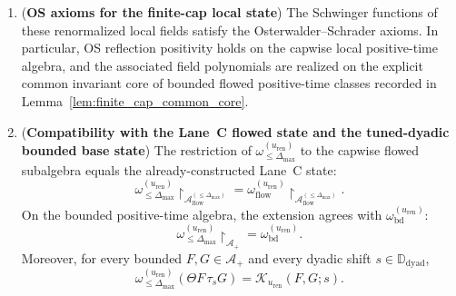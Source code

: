 \begin{theorem}
\begin{enumerate}[label=(\alph*)]
\[
\begin{aligned}
\lim_{t\downarrow 0}\, \omega_{\le \Delta_{\max}}^{(u_{\mathrm{ren}})}\Big(
&\mathcal O^{\mathrm{app},(\le \Delta_{\max})}_{j}(t;f;\mu)
\prod_{\ell=1}^{k} \mathcal X_{\ell}\Big)\\
={}&\omega_{\le \Delta_{\max}}^{(u_{\mathrm{ren}})}\Big(
\big(O^{(j),\mathrm{ren}}_{\le \Delta_{\max}}(f;\mu)
-\omega_{\le \Delta_{\max}}^{(u_{\mathrm{ren}})}(O^{(j),\mathrm{ren}}_{\le \Delta_{\max}}(f;\mu))\big)
\prod_{\ell=1}^{k} \mathcal X_{\ell}\Big).
\end{aligned}
\]
for every finite collection of renormalized local insertions $\{\mathcal X_{\ell}\}$ drawn from the same cap.
\item (\textbf{OS axioms for the finite-cap local state}) The Schwinger functions of these renormalized local fields satisfy the Osterwalder--Schrader axioms.
In particular, OS reflection positivity holds on the capwise local positive-time algebra, and the associated field polynomials are realized on the explicit common invariant core of bounded flowed positive-time classes recorded in Lemma~\ref{lem:finite_cap_common_core}.
\item (\textbf{Compatibility with the Lane~C flowed state and the tuned-dyadic bounded base state})
The restriction of $\omega_{\le \Delta_{\max}}^{(u_{\mathrm{ren}})}$ to the capwise flowed subalgebra equals the already-constructed Lane~C state:
\[
\omega_{\le \Delta_{\max}}^{(u_{\mathrm{ren}})}\!\restriction_{\mathcal A_{\mathrm{flow}}^{(\le \Delta_{\max})}}
=
\omega_{\mathrm{flow}}^{(u_{\mathrm{ren}})}\!\restriction_{\mathcal A_{\mathrm{flow}}^{(\le \Delta_{\max})}}.
\]
On the bounded positive-time algebra, the extension agrees with $\omega_{\mathrm{bd}}^{(u_{\mathrm{ren}})}$:
\[
\omega_{\le \Delta_{\max}}^{(u_{\mathrm{ren}})}\!\restriction_{\mathcal A_+}
=
\omega_{\mathrm{bd}}^{(u_{\mathrm{ren}})}.
\]
Moreover, for every bounded $F,G\in\mathcal A_+$ and every dyadic shift $s\in\mathbb D_{\mathrm{dyad}}$,
\[
\omega_{\le \Delta_{\max}}^{(u_{\mathrm{ren}})}(\Theta F\,\tau_s G)=\mathcal K_{u_{\mathrm{ren}}}(F,G;s).
\]
\end{enumerate}
\end{theorem}

